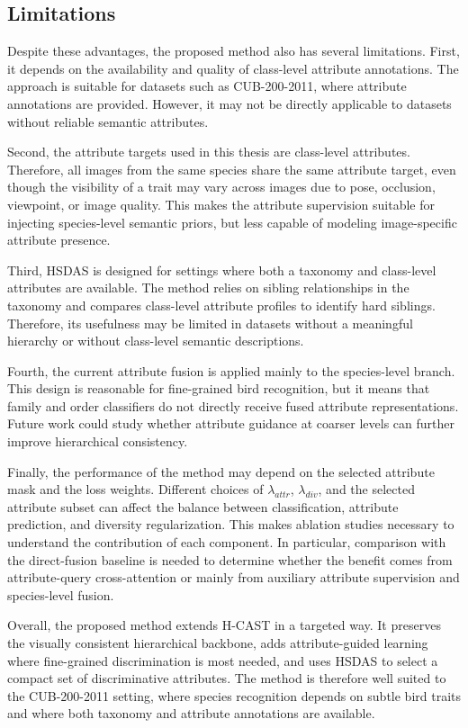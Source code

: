 \subsection{Limitations}

Despite these advantages, the proposed method also has several limitations. First, it depends on the availability and quality of class-level attribute annotations. The approach is suitable for datasets such as CUB-200-2011, where attribute annotations are provided. However, it may not be directly applicable to datasets without reliable semantic attributes.

Second, the attribute targets used in this thesis are class-level attributes. Therefore, all images from the same species share the same attribute target, even though the visibility of a trait may vary across images due to pose, occlusion, viewpoint, or image quality. This makes the attribute supervision suitable for injecting species-level semantic priors, but less capable of modeling image-specific attribute presence.

Third, HSDAS is designed for settings where both a taxonomy and class-level attributes are available. The method relies on sibling relationships in the taxonomy and compares class-level attribute profiles to identify hard siblings. Therefore, its usefulness may be limited in datasets without a meaningful hierarchy or without class-level semantic descriptions.

Fourth, the current attribute fusion is applied mainly to the species-level branch. This design is reasonable for fine-grained bird recognition, but it means that family and order classifiers do not directly receive fused attribute representations. Future work could study whether attribute guidance at coarser levels can further improve hierarchical consistency.

Finally, the performance of the method may depend on the selected attribute mask and the loss weights. Different choices of \(\lambda_{attr}\), \(\lambda_{div}\), and the selected attribute subset can affect the balance between classification, attribute prediction, and diversity regularization. This makes ablation studies necessary to understand the contribution of each component. In particular, comparison with the direct-fusion baseline is needed to determine whether the benefit comes from attribute-query cross-attention or mainly from auxiliary attribute supervision and species-level fusion.

Overall, the proposed method extends H-CAST in a targeted way. It preserves the visually consistent hierarchical backbone, adds attribute-guided learning where fine-grained discrimination is most needed, and uses HSDAS to select a compact set of discriminative attributes. The method is therefore well suited to the CUB-200-2011 setting, where species recognition depends on subtle bird traits and where both taxonomy and attribute annotations are available.